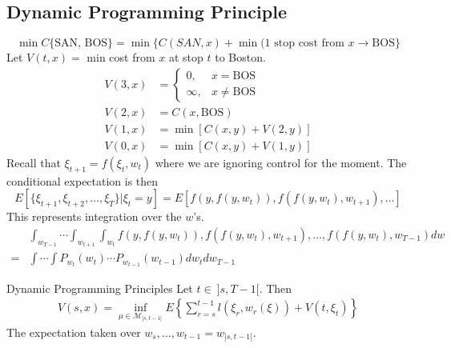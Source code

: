 \documentclass[lecture,12pt,]{pcms-l}
\theoremstyle{example}
\begin{document}
\subsection{Dynamic Programming Principle}
$$\min C\{\text{SAN, BOS}\} = \min\{C(SAN,x) + \min(\text{1 stop cost from }x\to\text{BOS}\}$$
Let $V(t,x) =$ min cost from $x$ at stop $t$ to Boston.
\begin{align*}
V(3,x) &= \begin{cases} 0, & x=\text{BOS} \\ \infty, & x\neq\text{BOS} \end{cases} \\
V(2,x) &= C(x,\text{BOS}) \\
V(1,x) &= \min[C(x,y)+V(2,y)] \\
V(0,x) &= \min[C(x,y)+V(1,y)]
\end{align*}
Recall that $\xi_{t+1}=f(\xi_t,w_t)$ where we are ignoring control for the moment. The conditional expectation is then
$$E[\{\xi_{t+1},\xi_{t+2},\ldots,\xi_T\}|\xi_t=y] = E[f(y,f(y,w_t)),f(f(y,w_t),w_{t+1}),\ldots]$$
This represents integration over the $w$'s.
\begin{align*}
&\int_{w_{T-1}}\cdots\int_{w_{t+1}}\int_{w_t}f(y,f(y,w_t)),f(f(y,w_t),w_{t+1}),\ldots,f(f(y,w_t),w_{T-1})dw \\
= &\int\cdots\int P_{w_t}(w_t)\cdots P_{w_{t-1}}(w_{t-1})dw_tdw_{T-1}
\end{align*}

\begin{theorem}{Dynamic Programming Principles}
Let $t\in~]s,T-1[$. Then
\begin{align}
\label{eq:dpp}
V(s,x) = \inf_{\mu\in\mathcal{M}_{]s,t-1[}}E\left\lbrace\sum_{r=s}^{t-1}l(\xi_r,w_r(\xi)) + V(t,\xi_t)\right\rbrace
\end{align}
The expectation taken over $w_s,\ldots,w_{t-1} = w_{]s,t-1[}$.
\end{theorem}
\end{document}
